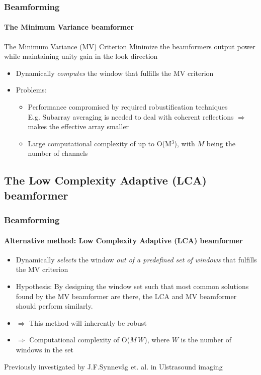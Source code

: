 \documentclass[
    beamer                                       %
 , xelatex                                      %
]{common/mytemplate}
\begin{document}
\begin{frame}
\frametitle{Beamforming}
\framesubtitle{The Minimum Variance beamformer}
\begin{block}{The Minimum Variance (MV) Criterion}
Minimize the beamformers output power while maintaining unity gain in the look direction
\end{block}
\begin{itemize}
\item Dynamically \emph{computes} the window that fulfills the MV criterion
\item Problems:
\begin{itemize}
\item Performance compromised by required robustification techniques\\
E.g. Subarray averaging is needed to deal with coherent reflections $\Rightarrow$ makes the effective array smaller
\item Large computational complexity of up to O(M$^3$), with $M$ being the number of channels
\end{itemize}
\end{itemize}
\end{frame}

\subsection{The Low Complexity Adaptive (LCA) beamformer}
\begin{frame}
\frametitle{Beamforming}
\framesubtitle{Alternative method: Low Complexity Adaptive (LCA) beamformer}
\begin{itemize}
\item Dynamically \emph{selects} the window \emph{out of a predefined set of windows} that fulfills the MV criterion
\item Hypothesis: By designing the window set such that most common solutions found by the MV beamformer are there, the LCA and MV beamformer should perform similarly.
\item $\Rightarrow$ This method will inherently be robust
\item $\Rightarrow$ Computational complexity of O($M\,W$), where $W$ is the number of windows in the set
\end{itemize}
Previously investigated by J.F.Synnevåg et. al. in Ulstrasound imaging
\end{frame}
\end{document}
